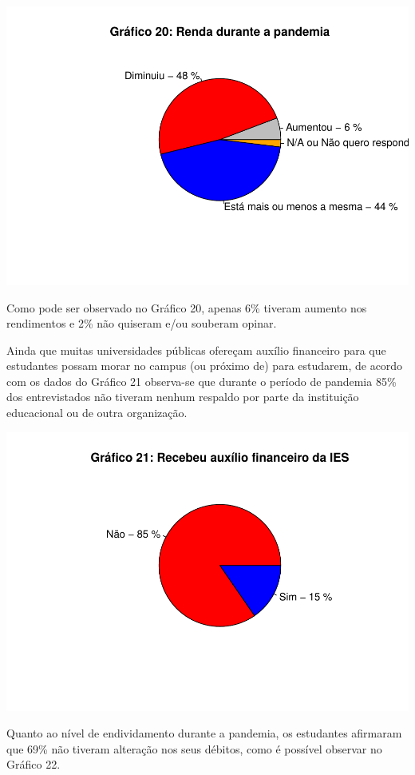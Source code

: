 \documentclass[
]{article}
\begin{document}
\includegraphics{consequencias-oriundas-da-pandemia-v1.0_files/figure-latex/grafico-20-1.pdf}

Como pode ser observado no Gráfico 20, apenas 6\% tiveram aumento nos
rendimentos e 2\% não quiseram e/ou souberam opinar.

Ainda que muitas universidades públicas ofereçam auxílio financeiro para
que estudantes possam morar no campus (ou próximo de) para estudarem, de
acordo com os dados do Gráfico 21 observa-se que durante o período de
pandemia 85\% dos entrevistados não tiveram nenhum respaldo por parte da
instituição educacional ou de outra organização.

\includegraphics{consequencias-oriundas-da-pandemia-v1.0_files/figure-latex/grafico-21-1.pdf}

Quanto ao nível de endividamento durante a pandemia, os estudantes
afirmaram que 69\% não tiveram alteração nos seus débitos, como é
possível observar no Gráfico 22.
\end{document}

